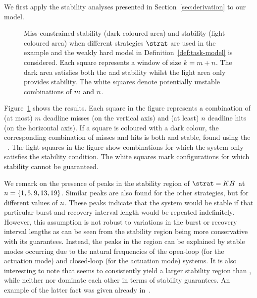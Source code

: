 We first apply the stability analyses presented in Section~\ref{sec:derivation} to our model.
\begin{figure}[t]
    \centerline{\resizebox{0.95\textwidth}{!}{}}
    \caption{Miss-constrained stability (dark coloured area) and \nilsstability{} stability (light coloured area) when different strategies $\strat$ are used in the example and the weakly hard model in Definition~\ref{def:task-model} is considered.
        Each square represents a window of size $k = m+n$.
        The dark area satisfies both the \switchingstability{} and \nilsstability{} stability whilst the light area only provides \nilsstability{} stability.
        The white squares denote potentially unstable combinations of $m$ and $n$.}
    \label{fig:stability_extended}
\end{figure}
Figure~\ref{fig:stability_extended} shows the results. Each square in the figure represents a combination of (at most) $m$ deadline misses (on the vertical axis) and (at least) $n$ deadline hits (on the horizontal axis).
If a square is coloured with a dark colour, the corresponding combination of misses and hits is both \nilsstability{} and \switchingstability{} stable, found using the ~\cite{Jungers:2014}. 
The light squares in the figure show combinations for which the system only satisfies the \nilsstability{} stability condition. 
The white squares mark configurations for which stability cannot be guaranteed.

We remark on the presence of peaks in the \nilsstability{} stability region of $\strat = KH$ at $n = \{1, 5, 9, 13, 19\}$.
Similar peaks are also found for the other strategies, but for different values of $n$.
These peaks indicate that the system would be stable if that particular burst and recovery interval length would be repeated indefinitely.
However, this assumption is not robust to variations in the burst or recovery interval lengths as can be seen from the \switchingstability{} stability region being more conservative with its guarantees.
Instead, the peaks in the \nilsstability{} region can be explained by stable modes occurring due to the natural frequencies of the open-loop (for the \tZ{} actuation mode) and closed-loop (for the \tH{} actuation mode) systems.
It is also interesting to note that \tK{} seems to consistently yield a larger stability region than \tS{}, while neither \tZ{} nor \tH{} dominate each other in terms of stability guarantees. An example of the latter fact was given already in~\cite{schenato09}.

